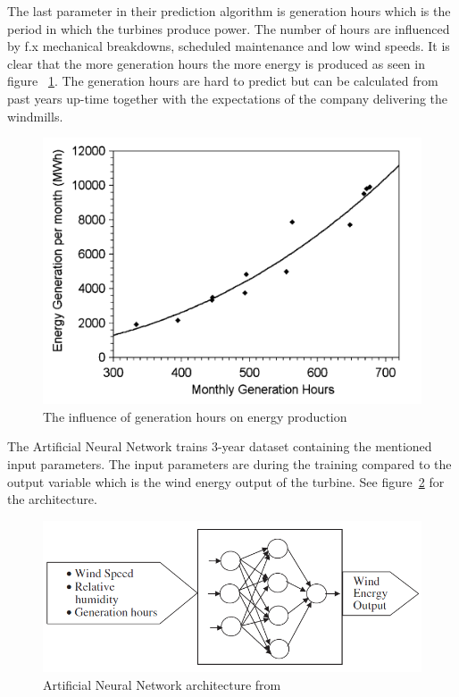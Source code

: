 The last parameter in their prediction algorithm is generation hours which is the period in which the turbines produce power. The number of hours are influenced by f.x mechanical breakdowns, scheduled maintenance and low wind speeds. It is clear that the more generation hours the more energy is produced as seen in figure ~\ref{fig:energyGenerationFromHours}. The generation hours are hard to predict but can be calculated from past years up-time together with the expectations of the company delivering the windmills.  

\begin{figure}[h!]
\centering
\includegraphics[width=0.8\linewidth,natwidth=898,natheight=587]{billeder/GenerationHourVSGeneration.png}
\caption{The influence of generation hours on energy production \cite{WindPowerGenerationUsingANN}}
\label{fig:energyGenerationFromHours}
\end{figure} 

The Artificial Neural Network trains 3-year dataset containing the mentioned input parameters. The input parameters are during the training compared to the output variable which is the wind energy output of the turbine. See figure~\ref{fig:annArchitecture} for the architecture.
\\[0.5cm]
\begin{figure}[h!]
\centering
\includegraphics[width=0.7\linewidth,natwidth=898,natheight=587]{billeder/ANNwindSpeedPrediction.png}
\caption{Artificial Neural Network architecture from \cite{WindPowerGenerationUsingANN}}
\label{fig:annArchitecture}
\end{figure}

